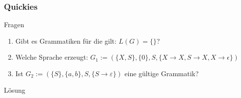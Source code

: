 \begin{frame}
    \frametitle{Quickies}
    \begin{exampleblock}{Fragen}
        \begin{enumerate}
          \item Gibt es Grammatiken für die gilt: $L(G) = \{\}$?\pause
          \item Welche Sprache erzeugt: $G_1 := (\{X, S\}, \{0\}, S, \{X \rightarrow X, S\rightarrow X, X \rightarrow \epsilon\})$\pause
          \item Ist $G_2 := (\{S\}, \{a, b\}, S, \{S \rightarrow \varepsilon\})$ eine gültige Grammatik?\pause
        \end{enumerate}
    \end{exampleblock}
    \begin{exampleblock}{Lösung}
        \begin{enumerate}
        \end{enumerate}
    \end{exampleblock}
\end{frame}

